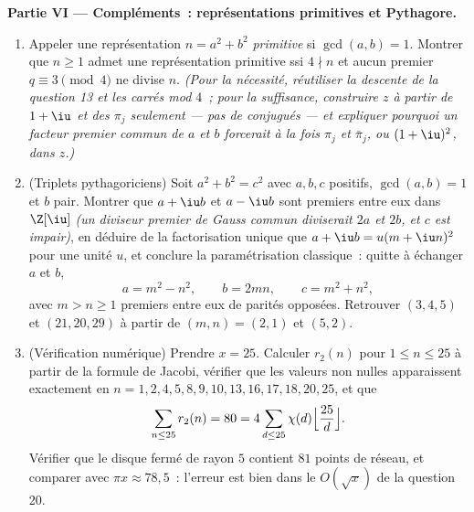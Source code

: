 \begin{problem}
\medskip
\noindent\textbf{Partie VI --- Compléments~: représentations
primitives et Pythagore.}
\begin{enumerate}[resume]
  \item Appeler une représentation $n = a^2 + b^2$
        \emph{primitive} si $\gcd(a, b) = 1$. Montrer que $n
        \geq 1$ admet une représentation primitive ssi $4 \nmid
        n$ et aucun premier $q \equiv 3 \pmod 4$ ne divise $n$.
        \emph{(Pour la nécessité, réutiliser la descente de la
        question 13 et les carrés mod $4$~; pour la suffisance,
        construire $z$ à partir de $1 + \iu$ et des $\pi_j$
        seulement --- pas de conjugués --- et expliquer
        pourquoi un facteur premier commun de $a$ et $b$
        forcerait à la fois $\pi_j$ et $\bar\pi_j$, ou
        $(1+\iu)^2$, dans $z$.)}
  \item (Triplets pythagoriciens) Soit $a^2 + b^2 = c^2$ avec
        $a, b, c$ positifs, $\gcd(a, b) = 1$ et $b$ pair.
        Montrer que $a + \iu b$ et $a - \iu b$ sont premiers
        entre eux dans $\Z[\iu]$ \emph{(un diviseur premier de
        Gauss commun diviserait $2a$ et $2b$, et $c$ est
        impair)}, en déduire de la factorisation unique que $a
        + \iu b = u(m + \iu n)^2$ pour une unité $u$, et
        conclure la paramétrisation classique~: quitte à
        échanger $a$ et $b$,
        \[
        a = m^2 - n^2, \qquad b = 2mn, \qquad c = m^2 + n^2,
        \]
        avec $m > n \geq 1$ premiers entre eux de parités
        opposées. Retrouver $(3, 4, 5)$ et $(21, 20, 29)$ à
        partir de $(m, n) = (2, 1)$ et $(5, 2)$.
  \item (Vérification numérique) Prendre $x = 25$. Calculer
        $r_2(n)$ pour $1 \leq n \leq 25$ à partir de la formule
        de Jacobi, vérifier que les valeurs non nulles
        apparaissent exactement en $n = 1, 2, 4, 5, 8, 9, 10,
        13, 16, 17, 18, 20, 25$, et que
        \[
        \sum_{n \leq 25} r_2(n) = 80
        = 4\sum_{d \leq 25}\chi(d)
        \Bigl\lfloor\frac{25}d\Bigr\rfloor .
        \]
        Vérifier que le disque fermé de rayon $5$ contient $81$
        points de réseau, et comparer avec $\pi x \approx
        78{,}5$~: l'erreur est bien dans le $O(\sqrt x)$ de la
        question 20.
\end{enumerate}
\end{problem}
